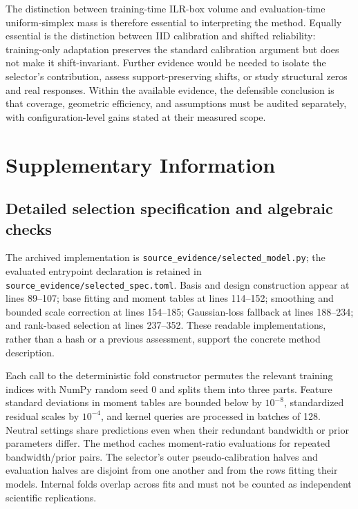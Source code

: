 \documentclass{article}
\begin{document}
The distinction between training-time ILR-box volume and evaluation-time uniform-simplex mass is therefore essential to interpreting the method. Equally essential is the distinction between IID calibration and shifted reliability: training-only adaptation preserves the standard calibration argument but does not make it shift-invariant. Further evidence would be needed to isolate the selector's contribution, assess support-preserving shifts, or study structural zeros and real responses. Within the available evidence, the defensible conclusion is that coverage, geometric efficiency, and assumptions must be audited separately, with configuration-level gains stated at their measured scope.

\clearpage


\clearpage
\appendix
\section{Supplementary Information}
\label{sec:supplement}

\subsection{Detailed selection specification and algebraic checks}
The archived implementation is \texttt{source\_evidence/selected\_model.py}; the evaluated entrypoint declaration is retained in \texttt{source\_evidence/selected\_spec.toml}. Basis and design construction appear at lines 89--107; base fitting and moment tables at lines 114--152; smoothing and bounded scale correction at lines 154--185; Gaussian-loss fallback at lines 188--234; and rank-based selection at lines 237--352. These readable implementations, rather than a hash or a previous assessment, support the concrete method description. %

Each call to the deterministic fold constructor permutes the relevant training indices with NumPy random seed 0 and splits them into three parts. Feature standard deviations in moment tables are bounded below by $10^{-8}$, standardized residual scales by $10^{-4}$, and kernel queries are processed in batches of 128. Neutral settings share predictions even when their redundant bandwidth or prior parameters differ. The method caches moment-ratio evaluations for repeated bandwidth/prior pairs. The selector's outer pseudo-calibration halves and evaluation halves are disjoint from one another and from the rows fitting their models. Internal folds overlap across fits and must not be counted as independent scientific replications. %
\end{document}
